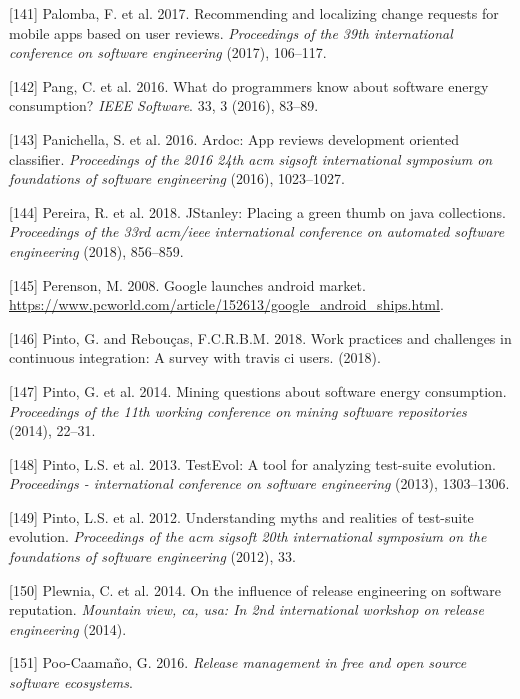 \documentclass[]{book}
\begin{document}
\hypertarget{ref-palomba2017recommending}{}
{[}141{]} Palomba, F. et al. 2017. Recommending and localizing change
requests for mobile apps based on user reviews. \emph{Proceedings of the
39th international conference on software engineering} (2017), 106--117.

\hypertarget{ref-PHA2016}{}
{[}142{]} Pang, C. et al. 2016. What do programmers know about software
energy consumption? \emph{IEEE Software}. 33, 3 (2016), 83--89.

\hypertarget{ref-panichella2016ardoc}{}
{[}143{]} Panichella, S. et al. 2016. Ardoc: App reviews development
oriented classifier. \emph{Proceedings of the 2016 24th acm sigsoft
international symposium on foundations of software engineering} (2016),
1023--1027.

\hypertarget{ref-PSCS2018}{}
{[}144{]} Pereira, R. et al. 2018. JStanley: Placing a green thumb on
java collections. \emph{Proceedings of the 33rd acm/ieee international
conference on automated software engineering} (2018), 856--859.

\hypertarget{ref-androidMarketLaunch}{}
{[}145{]} Perenson, M. 2008. Google launches android market.
\url{https://www.pcworld.com/article/152613/google_android_ships.html}.

\hypertarget{ref-pinto2018work}{}
{[}146{]} Pinto, G. and Rebouças, F.C.R.B.M. 2018. Work practices and
challenges in continuous integration: A survey with travis ci users.
(2018).

\hypertarget{ref-PCL2014}{}
{[}147{]} Pinto, G. et al. 2014. Mining questions about software energy
consumption. \emph{Proceedings of the 11th working conference on mining
software repositories} (2014), 22--31.

\hypertarget{ref-pinto2013}{}
{[}148{]} Pinto, L.S. et al. 2013. TestEvol: A tool for analyzing
test-suite evolution. \emph{Proceedings - international conference on
software engineering} (2013), 1303--1306.

\hypertarget{ref-pinto2012understanding}{}
{[}149{]} Pinto, L.S. et al. 2012. Understanding myths and realities of
test-suite evolution. \emph{Proceedings of the acm sigsoft 20th
international symposium on the foundations of software engineering}
(2012), 33.

\hypertarget{ref-plewnia2014a}{}
{[}150{]} Plewnia, C. et al. 2014. On the influence of release
engineering on software reputation. \emph{Mountain view, ca, usa: In 2nd
international workshop on release engineering} (2014).

\hypertarget{ref-poo-caamano2016a}{}
{[}151{]} Poo-Caamaño, G. 2016. \emph{Release management in free and
open source software ecosystems}.
\end{document}

